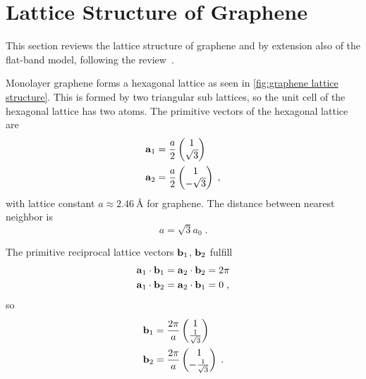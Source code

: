 \documentclass[../main.tex]{subfiles}
\begin{document}
\section{Lattice Structure of Graphene}\label{sec:lattice-structure-of-graphene}

This section reviews the lattice structure of graphene and by extension also of the flat-band model, following the review~\cite{yangStructureGrapheneIts2018}.

Monolayer graphene forms a hexagonal lattice as seen in \cref{fig:graphene lattice structure}.
This is formed by two triangular sub lattices, so the unit cell of the hexagonal lattice has two atoms.
The primitive vectors of the hexagonal lattice are
\begin{align}
	\bm{\mathrm{a}}_1 &= \frac{a}{2} \begin{pmatrix} 1 \\ \sqrt{3} \end{pmatrix} \notag\\
	\bm{\mathrm{a}}_2 &= \frac{a}{2} \begin{pmatrix} 1 \\ -\sqrt{3} \end{pmatrix}
	\;,
\end{align}
with lattice constant \(a \approx \qty{2.46}{\angstrom}\) for graphene.
The distance between nearest neighbor is
\begin{equation}
	a = \sqrt{3} a_0 \;.
\end{equation}

The primitive reciprocal lattice vectors \(\bm{\mathrm{b}}_1\), \(\bm{\mathrm{b}}_2\) fulfill
\begin{align}
	\bm{\mathrm{a}}_1 \cdot \bm{\mathrm{b}}_1 &= \bm{\mathrm{a}}_2 \cdot \bm{\mathrm{b}}_2 = 2\pi \notag\\
	\bm{\mathrm{a}}_1 \cdot \bm{\mathrm{b}}_2 &= \bm{\mathrm{a}}_2 \cdot \bm{\mathrm{b}}_1 = 0
	\;,
\end{align}
so
\begin{align}
	\bm{\mathrm{b}}_1 &= \frac{2\pi}{a} \begin{pmatrix} 1 \\ \frac{1}{\sqrt{3}} \end{pmatrix} \notag\\
	\bm{\mathrm{b}}_2 &= \frac{2\pi}{a} \begin{pmatrix} 1 \\ - \frac{1}{\sqrt{3}} \end{pmatrix}
	\;.
\end{align}
\end{document}
